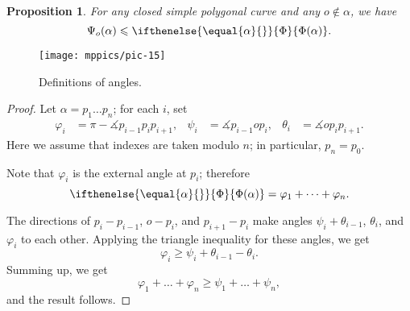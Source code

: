 \documentclass{article}
\theoremstyle{theorem}
\newtheorem{Proposition}[theorem]{Proposition}
\newtheorem{Crofton-type formula}[theorem]{Crofton-type formula}
\newtheorem{Douglas--Rado theorem}[theorem]{Douglas--Rado theorem}
\newtheorem{Extended monotonicity theorem}[theorem]{Extended monotonicity theorem}
\theoremstyle{definition}
\newcommand*{\tc}[1]{\ifthenelse{\equal{#1}{}}{\Phi}{\Phi({#1})}}%
\def\phi{\varphi}
\def\ge{\geqslant}
\def\le{\leqslant}
\begin{document}
\begin{Proposition}\label{prop:angular-length}
For any closed simple polygonal curve and any $o\notin\alpha$, we have 
\[\Psi_o(\alpha)\le \tc{\alpha}.\]
\end{Proposition}

\begin{figure}[!ht]
\vskip-0mm
\centering
\texttt{[image: mppics/pic-15]}
\caption{Definitions of angles.}
\vskip0mm
\end{figure}

\begin{proof}
Let $\alpha=p_1\dots p_n$; for each $i$, set 
\begin{align*}
\phi_i&=\pi-\measuredangle p_{i-1}p_ip_{i+1},
&
\psi_i&=\measuredangle p_{i-1} o p_{i},
&
\theta_i&=\measuredangle o p_i p_{i+1}.
\end{align*}
Here we assume that indexes are taken modulo $n$; in particular, $p_{n}=p_0$.

Note that $\phi_i$ is the external angle at $p_i$;
therefore 
\[\tc\alpha= \phi_1+\dots+\phi_n.\]

The directions of $p_i-p_{i-1}$, $o-p_i$, and $p_{i+1}-p_i$ make angles 
$\psi_i+\theta_{i-1}$, $\theta_i$, and $\phi_i$ to each other.
Applying the triangle inequality for these angles, we get
\[\phi_i\ge \psi_i+\theta_{i-1}-\theta_i.\]
Summing up, we get
\[\phi_1+\dots+\phi_n\ge \psi_1+\dots+\psi_n,\]
and the result follows.
\end{proof}
\end{document}
